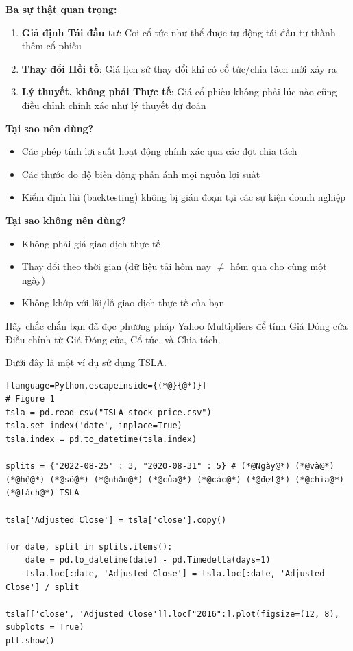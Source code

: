 \textbf{Ba sự thật quan trọng:}

\begin{enumerate}
  \item \textbf{Giả định Tái đầu tư}: Coi cổ tức như thể được tự động tái đầu tư thành thêm cổ phiếu
  \item \textbf{Thay đổi Hồi tố}: Giá lịch sử thay đổi khi có cổ tức/chia tách mới xảy ra
  \item \textbf{Lý thuyết, không phải Thực tế}: Giá cổ phiếu không phải lúc nào cũng điều chỉnh chính xác như lý thuyết dự đoán
\end{enumerate}

\textbf{Tại sao nên dùng?}
\begin{itemize}
  \item Các phép tính lợi suất hoạt động chính xác qua các đợt chia tách
  \item Các thước đo độ biến động phản ánh mọi nguồn lợi suất
  \item Kiểm định lùi (backtesting) không bị gián đoạn tại các sự kiện doanh nghiệp
\end{itemize}

\textbf{Tại sao không nên dùng?}
\begin{itemize}
  \item Không phải giá giao dịch thực tế
  \item Thay đổi theo thời gian (dữ liệu tải hôm nay $\neq$ hôm qua cho cùng một ngày)
  \item Không khớp với lãi/lỗ giao dịch thực tế của bạn
\end{itemize}

Hãy chắc chắn bạn đã đọc phương pháp Yahoo Multipliers để tính Giá Đóng cửa Điều chỉnh từ Giá Đóng cửa, Cổ tức, và Chia tách.

Dưới đây là một ví dụ sử dụng TSLA.

\begin{lstlisting}[language=Python,escapeinside={(*@}{@*)}]
# Figure 1
tsla = pd.read_csv("TSLA_stock_price.csv")
tsla.set_index('date', inplace=True)
tsla.index = pd.to_datetime(tsla.index)

splits = {'2022-08-25' : 3, "2020-08-31" : 5} # (*@Ngày@*) (*@và@*) (*@hệ@*) (*@số@*) (*@nhân@*) (*@của@*) (*@các@*) (*@đợt@*) (*@chia@*) (*@tách@*) TSLA

tsla['Adjusted Close'] = tsla['close'].copy()

for date, split in splits.items():
    date = pd.to_datetime(date) - pd.Timedelta(days=1)
    tsla.loc[:date, 'Adjusted Close'] = tsla.loc[:date, 'Adjusted Close'] / split

tsla[['close', 'Adjusted Close']].loc["2016":].plot(figsize=(12, 8), subplots = True)
plt.show()
\end{lstlisting}


